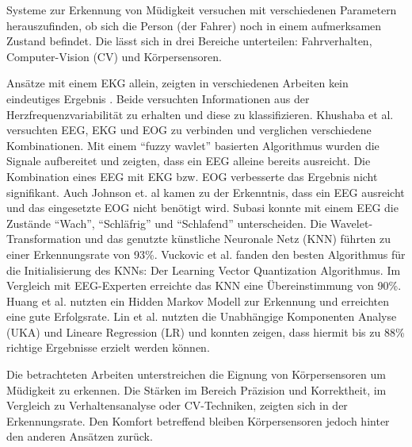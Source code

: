 \label{chap:state}
Systeme zur Erkennung von Müdigkeit versuchen mit verschiedenen Parametern herauszufinden, ob sich die Person (der Fahrer) noch in einem aufmerksamen Zustand befindet. Die lässt sich in drei Bereiche unterteilen: Fahrverhalten, Computer-Vision (CV) und Körpersensoren. 
\comp

Ansätze mit einem EKG allein, zeigten in verschiedenen Arbeiten kein eindeutiges Ergebnis \cite{Vicente_6164509}\cite{Rogado_4913155}. Beide versuchten Informationen aus der Herzfrequenzvariabilität zu erhalten und diese zu klassifizieren. 
Khushaba et al. \cite{Khushaba_5580017} versuchten EEG, EKG und EOG zu verbinden und verglichen verschiedene Kombinationen. Mit einem "`fuzzy wavlet"' basierten Algorithmus wurden die Signale aufbereitet und zeigten, dass ein EEG alleine bereits ausreicht. Die Kombination eines EEG mit EKG bzw. EOG verbesserte das Ergebnis nicht signifikant. Auch Johnson et. al \cite{Johnson11} kamen zu der Erkenntnis, dass ein EEG ausreicht und das eingesetzte EOG nicht benötigt wird. Subasi \cite{Subasi:2005:ARA:1707423.1707550} konnte mit einem EEG die Zustände "`Wach"', "`Schläfrig"' und "`Schlafend"' unterscheiden. Die Wavelet-Transformation und das genutzte künstliche Neuronale Netz (KNN) führten zu einer Erkennungsrate von 93\%. Vuckovic et al. \cite{Vuckovic2002349} fanden den besten Algorithmus für die Initialisierung des KNNs: Der Learning Vector Quantization Algorithmus. Im Vergleich mit EEG-Experten erreichte das KNN eine Übereinstimmung von 90\%. Huang et al. \cite{Huang_548971} nutzten ein Hidden Markov Modell zur Erkennung und erreichten eine gute Erfolgsrate. Lin et al. \cite{Lin05eeg-baseddrowsiness} nutzten die Unabhängige Komponenten Analyse (UKA) und Lineare Regression (LR) und konnten zeigen, dass hiermit  bis zu 88\% richtige Ergebnisse erzielt werden können. 

Die betrachteten Arbeiten unterstreichen die Eignung von Körpersensoren  um Müdigkeit zu erkennen. Die Stärken im Bereich Präzision und Korrektheit, im Vergleich zu Verhaltensanalyse oder CV-Techniken, zeigten sich in der Erkennungsrate. Den Komfort betreffend bleiben Körpersensoren jedoch hinter den anderen Ansätzen zurück. 

